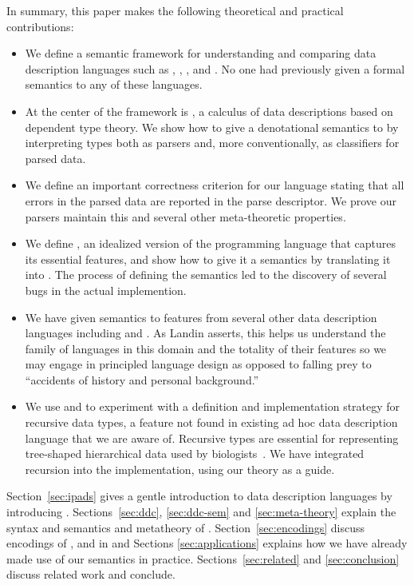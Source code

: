 In summary, this paper makes the following theoretical and practical
contributions:
%
\begin{itemize}
\item We define a semantic framework for understanding and comparing data description languages such as \pads{},
\packettypes{}, \datascript{}, and \blt{}.
No one had previously given a formal semantics to any of these 
languages.

\item At the center of the framework is \ddc{},
a calculus of data descriptions based on dependent type theory.
We show how to give a denotational semantics
to \ddc{} by interpreting
types both as parsers and, more conventionally, 
as classifiers for parsed data. 

\item We define an important correctness criterion for our language
stating that all errors in the parsed data are reported in the parse 
descriptor.  We prove our \ddc{} parsers maintain this and several
other meta-theoretic properties.

\item We define \ipads{}, an idealized
version of the \pads{} programming language
that captures its essential features,
and show how to give it a semantics by translating it into \ddc{}.  
The process of defining the semantics led to the
discovery of several bugs in the actual implemention.

\item We have given semantics to features from several other data description
languages including \packettypes{} and \datascript.  As Landin asserts, 
this helps us understand the family of languages in this domain
and the totality of their features so we may engage in principled
language design
as opposed to falling prey to ``accidents of history and personal background.''

\item We use \ipads{} and \ddc{} to experiment with 
a definition and implementation strategy for recursive data types,
a feature not found in existing ad hoc data description language that
we are aware of.  Recursive types are essential for representing 
tree-shaped hierarchical
data used by biologists~\cite{geneontology,newick}.  
We have integrated recursion into the \pads{} implementation,
using our theory as a guide. 
\end{itemize}

Section~\ref{sec:ipads} gives a gentle introduction to data description
languages by introducing \ipads.  Sections~\ref{sec:ddc}, \ref{sec:ddc-sem} and \ref{sec:meta-theory}
explain the syntax and semantics and metatheory of \ddc{}.
Section~\ref{sec:encodings}  discuss encodings of \ipads{}, \packettypes
and \datascript{} in \ddc{} and Sections \ref{sec:applications}
explains how we have already made use of our semantics in practice.  
Sections~\ref{sec:related} and 
\ref{sec:conclusion} discuss related work and conclude.
